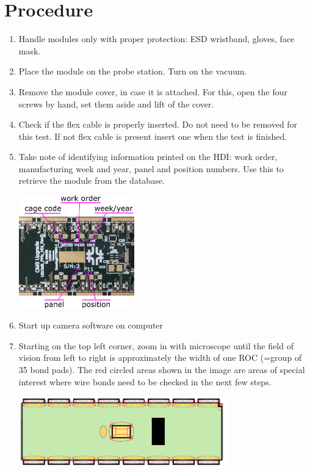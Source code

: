 \documentclass[12pt]{unlsilabsop}
\begin{document}
\section{Procedure}

\begin{enumerate}
    \item Handle modules only with proper protection: ESD wristband, gloves, face mask.
    \item Place the module on the probe station. Turn on the vacuum.
    \item Remove the module cover, in case it is attached. For this, open the four screws by hand, set them aside and lift of the cover.
    \item Check if the flex cable is properly inserted. Do not need to be removed for this test. If not flex cable is present insert one when the test is finished.
    \item Take note of identifying information printed on the HDI: work order, manufacturing week and year, panel and position numbers. Use this to retrieve the module from the database.

    \begin{center}
        \includegraphics[width=5cm]{img/HDIRevD_id.png}
    \end{center}

    \item Start up camera software on computer
    \item Starting on the top left corner, zoom in with microscope until the field of vision from left to right is approximately the width of one ROC (=group of 35 bond pads). The red circled areas shown in the image are areas of special interest where wire bonds need to be checked in the next few steps.

    \begin{center}
        \includegraphics[width=9cm]{img/ModuleSchematicInpsection.pdf}
    \end{center}


\end{enumerate}
\end{document}
